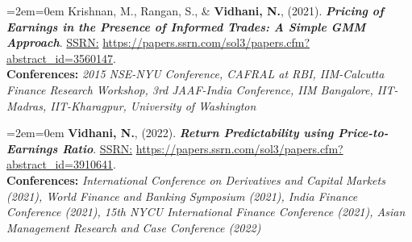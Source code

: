 \documentclass[11pt,a4paper,]{moderncv}
\begin{document}
\bgroup %
  \par%
  \medskip
  \leftskip=2em\rightskip=0em%
  \noindent\ignorespaces
Krishnan, M., Rangan, S., \& \textbf{Vidhani, N.}, (2021). \textbf{\textit{Pricing of Earnings in the Presence of Informed Trades: A Simple GMM Approach}}. \underline{SSRN:} \url{https://papers.ssrn.com/sol3/papers.cfm?abstract_id=3560147}.\\
\textbf{Conferences:} \textit{2015 NSE-NYU Conference, CAFRAL at RBI, IIM-Calcutta Finance Research Workshop, 3rd JAAF-India Conference, IIM Bangalore, IIT-Madras, IIT-Kharagpur, University of Washington}\\
%
  \par\medskip\egroup

\bgroup %
  \par%
  \medskip
  \leftskip=2em\rightskip=0em%
  \noindent\ignorespaces
\textbf{Vidhani, N.}, (2022). \textbf{\textit{Return Predictability using
Price-to-Earnings Ratio}}. \underline{SSRN:} \url{https://papers.ssrn.com/sol3/papers.cfm?abstract_id=3910641}.\\
\textbf{Conferences:} \textit{International Conference on Derivatives and Capital Markets (2021), World Finance and Banking Symposium (2021), India Finance Conference (2021), 15th NYCU International Finance Conference (2021), Asian Management Research and Case Conference (2022)}\\
%
  \par\medskip\egroup

\endgroup
\end{document}
